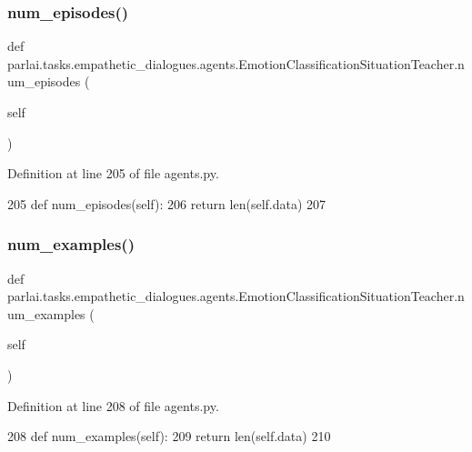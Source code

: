 \subsubsection{\texorpdfstring{num\+\_\+episodes()}{num\_episodes()}}
{\footnotesize\ttfamily def parlai.\+tasks.\+empathetic\+\_\+dialogues.\+agents.\+Emotion\+Classification\+Situation\+Teacher.\+num\+\_\+episodes (\begin{DoxyParamCaption}\item[{}]{self }\end{DoxyParamCaption})}



Definition at line 205 of file agents.\+py.


\begin{DoxyCode}
205     \textcolor{keyword}{def }num\_episodes(self):
206         \textcolor{keywordflow}{return} len(self.data)
207 
\end{DoxyCode}
\mbox{\label{classparlai_1_1tasks_1_1empathetic__dialogues_1_1agents_1_1EmotionClassificationSituationTeacher_aba2e962c46d7575ffa9138254d192656}} 
\subsubsection{\texorpdfstring{num\+\_\+examples()}{num\_examples()}}
{\footnotesize\ttfamily def parlai.\+tasks.\+empathetic\+\_\+dialogues.\+agents.\+Emotion\+Classification\+Situation\+Teacher.\+num\+\_\+examples (\begin{DoxyParamCaption}\item[{}]{self }\end{DoxyParamCaption})}



Definition at line 208 of file agents.\+py.


\begin{DoxyCode}
208     \textcolor{keyword}{def }num\_examples(self):
209         \textcolor{keywordflow}{return} len(self.data)
210 
\end{DoxyCode}


